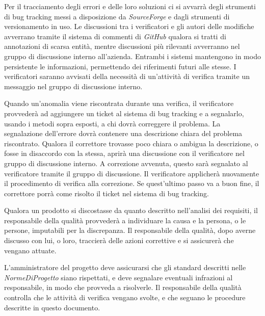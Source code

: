 Per il tracciamento degli errori e delle loro soluzioni ci si avvarr\`a degli strumenti di bug tracking messi a disposizione da \textit{SourceForge} e dagli strumenti di versionamento in uso.
Le discussioni tra i verificatori e gli autori delle modifiche avverrano tramite il sistema di commenti di \textit{GitHub} qualora si tratti di annotazioni di scarsa entit\`a, mentre discussioni pi\`u rilevanti avverranno nel gruppo di discussione interno all'azienda. Entrambi i sistemi mantengono in modo persistente le informazioni, permettendo dei riferimenti futuri alle stesse. I verificatori saranno avvisati della necessit\`a di un'attivit\`a di verifica tramite un messaggio nel gruppo di discussione interno. 



Quando un'anomalia viene riscontrata durante una verifica, il verificatore provveder\`a ad aggiungere un ticket al sistema di bug tracking e a segnalarlo, usando i metodi sopra esposti, a chi dovr\`a correggere il problema. La segnalazione dell'errore dovr\`a contenere una descrizione chiara del problema riscontrato. Qualora il correttore trovasse poco chiara o ambigua la descrizione, o fosse in disaccordo con la stessa, aprir\`a una discussione con il verificatore nel gruppo di discussione interno. A correzione avvenuta, questo sar\`a segnalato al verificatore tramite il gruppo di discussione. Il verificatore applicher\`a nuovamente il procedimento di verifica alla correzione. Se quest'ultimo passo va a buon fine, il correttore porr\`a come risolto il ticket nel sistema di bug tracking.

Qualora un prodotto si discostasse da quanto descritto nell'analisi dei requisiti, il responsabile della qualit\`a provveder\`a a individuare la causa e la persona, o le persone, imputabili per la discrepanza. Il responsabile della qualit\`a, dopo averne discusso con lui, o loro, traccier\`a delle azioni correttive e si assicurer\`a che vengano attuate.

L'amministratore del progetto deve assicurarsi che gli standard descritti nelle \textit{NormeDiProgetto} siano rispettati, e deve segnalare eventuali infrazioni al responsabile, in modo che provveda a risolverle. Il responsabile della qualit\`a controlla che le attivit\`a di verifica vengano svolte, e che seguano le procedure descritte in questo documento.
\newpage

